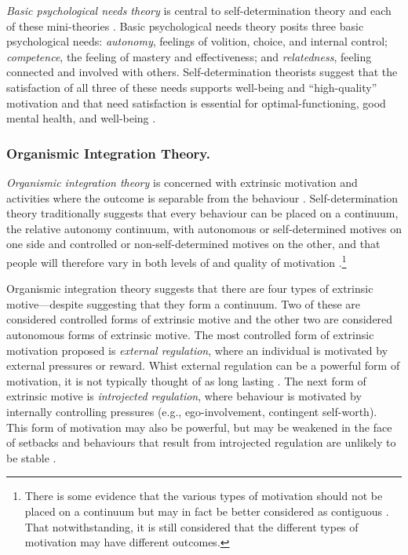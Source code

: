 \documentclass[
  12pt,
  a4paper,
]{book}
\begin{document}
\emph{Basic psychological needs theory} is central to self-determination theory and each of these mini-theories \citep{Ryan2002}. Basic psychological needs theory posits three basic psychological needs: \emph{autonomy}, feelings of volition, choice, and internal control; \emph{competence}, the feeling of mastery and effectiveness; and \emph{relatedness}, feeling connected and involved with others. Self-determination theorists suggest that the satisfaction of all three of these needs supports well-being and ``high-quality'' motivation \citep{Ryan2019} and that need satisfaction is essential for optimal-functioning, good mental health, and well-being \citep{Chen2015, Deci2000}.

\hypertarget{organismic-integration-theory.}{%
\subsubsection{Organismic Integration Theory.}\label{organismic-integration-theory.}}

\emph{Organismic integration theory} is concerned with extrinsic motivation and activities where the outcome is separable from the behaviour \citep{Ryan1985}. Self-determination theory traditionally suggests that every behaviour can be placed on a continuum, the relative autonomy continuum, with autonomous or self-determined motives on one side and controlled or non-self-determined motives on the other, and that people will therefore vary in both levels of and quality of motivation \citep{Deci1985b, Sheldon2019}.\footnote{There is some evidence that the various types of motivation should not be placed on a continuum but may in fact be better considered as contiguous \citep{Chemolli2014}. That notwithstanding, it is still considered that the different types of motivation may have different outcomes.}

Organismic integration theory suggests that there are four types of extrinsic motive---despite suggesting that they form a continuum. Two of these are considered controlled forms of extrinsic motive and the other two are considered autonomous forms of extrinsic motive. The most controlled form of extrinsic motivation proposed is \emph{external regulation}, where an individual is motivated by external pressures or reward. Whist external regulation can be a powerful form of motivation, it is not typically thought of as long lasting \citep{Ryan2000c}. The next form of extrinsic motive is \emph{introjected regulation}, where behaviour is motivated by internally controlling pressures (e.g., ego-involvement, contingent self-worth). This form of motivation may also be powerful, but may be weakened in the face of setbacks and behaviours that result from introjected regulation are unlikely to be stable \citep{Deci1995, Ryan2019}.
\end{document}
